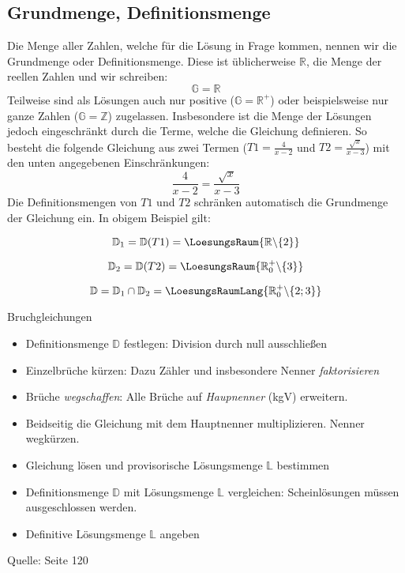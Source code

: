   
  \subsection{Grundmenge, Definitionsmenge}
  Die Menge aller Zahlen, welche für die Lösung in Frage kommen,
  nennen wir die Grundmenge oder Definitionsmenge. Diese ist üblicherweise $\mathbb{R}$, die
  Menge der reellen Zahlen und wir schreiben:
  $$\mathbb{G}=\mathbb{R}$$
  Teilweise sind als Lösungen auch nur positive ($\mathbb{G}=\mathbb{R}^+$) oder
  beispielsweise nur ganze Zahlen ($\mathbb{G}=\mathbb{Z}$)
  zugelassen.
  Insbesondere ist die Menge der Lösungen jedoch eingeschränkt durch
  die Terme, welche die Gleichung definieren. So besteht die folgende
  Gleichung aus zwei Termen ($T1=\frac{4}{x-2}$ und $T2=\frac{\sqrt{x}}{x-3}$) mit den unten angegebenen
  Einschränkungen:
  $$\frac{4}{x-2}=\frac{\sqrt{x}}{x-3}$$
  Die Definitionsmengen von $T1$ und $T2$ schränken automatisch die
  Grundmenge der Gleichung ein. In obigem Beispiel gilt:
  
  $$\mathbb{D}_1=\mathbb{D}(T1)=\LoesungsRaum{\mathbb{R}\backslash\{2\}}$$

  $$\mathbb{D}_2=\mathbb{D}(T2)=\LoesungsRaum{\mathbb{R}^+_0\backslash\{3\}}$$

  $$\mathbb{D}=\mathbb{D}_1\cap\mathbb{D}_2=\LoesungsRaumLang{\mathbb{R}^{+}_{0}\backslash\{2;3\}}$$

  \newpage
  
\begin{rezept}{Bruchgleichungen}{}
  \begin{itemize}
    \item Definitionsmenge $\mathbb{D}$ festlegen: Division durch null ausschließen
  \item Einzelbrüche kürzen: Dazu Zähler und insbesondere Nenner \textit{faktorisieren}
  \item Brüche \textit{wegschaffen}: Alle Brüche auf
    \textit{Haupnenner} (kgV) erweitern.
  \item Beidseitig die Gleichung mit dem Hauptnenner
    multiplizieren. Nenner wegkürzen.
  \item Gleichung lösen und provisorische Lösungsmenge $\mathbb{L}$
    bestimmen
  \item Definitionsmenge $\mathbb{D}$ mit Lösungsmenge $\mathbb{L}$
    vergleichen: Scheinlösungen müssen ausgeschlossen werden.
  \item Definitive Lösungsmenge $\mathbb{L}$ angeben
    \end{itemize}
  Quelle: \cite{marthaler21} Seite 120
\end{rezept}

\newpage
